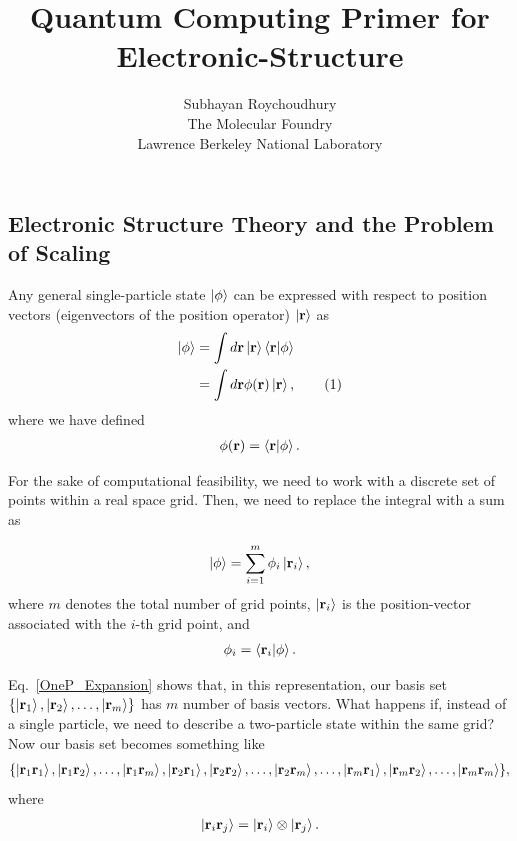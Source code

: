 \documentclass[12pt,oneside]{book}
\title{Quantum Computing Primer for Electronic-Structure}
\author{Subhayan Roychoudhury\\ The Molecular Foundry\\ Lawrence Berkeley National Laboratory}
\date{}
\newcommand\numberthis{\addtocounter{equation}{1}\tag{\theequation}}
\begin{document}
\maketitle

\subsection*{Electronic Structure Theory and the Problem of Scaling}

Any general single-particle state $\ket{\phi}$ can be expressed with respect to position vectors (eigenvectors of the position operator) $\ket{\mathbf{r}}$ as
\begin{align*}
    \ket{\phi} &{}= \int d \mathbf{r} \ket{\mathbf{r}}\braket{\mathbf{r}|\phi}\\
    &{} = \int d\mathbf{r} \phi(\mathbf{r})\ket{\mathbf{r}}, \numberthis
\end{align*}
where we have defined
\begin{align}
    \phi(\mathbf{r})= \braket{\mathbf{r}|\phi}.
\end{align}

For the sake of computational feasibility, we need to work with a discrete set of points within a real space grid. Then, we need to replace the integral with a sum as

\begin{align}\label{OneP_Expansion}
    \ket{\phi} = \sum_{i=1}^m \phi_i \ket{\mathbf{r}_i},
\end{align}
where $m$ denotes the total number of grid points, $\ket{\mathbf{r}_i}$ is the position-vector associated with the $i$-th grid point, and 
\begin{align}
    \phi_i=\braket{\mathbf{r}_i|\phi}.
\end{align}

Eq.~\ref{OneP_Expansion} shows that, in this representation, our basis set $\{\ket{\mathbf{r}_1}, \ket{\mathbf{r}_2},\hdots, \ket{\mathbf{r}_m}\}$ has $m$ number of basis vectors. What happens if, instead of a single particle, we need to describe a two-particle state within the same grid? Now our basis set becomes something like
\begin{align*}
    \{\ket{\mathbf{r}_1\mathbf{r}_1}, \ket{\mathbf{r}_1\mathbf{r}_2} , \hdots , \ket{\mathbf{r}_1\mathbf{r}_m}, \ket{\mathbf{r}_2\mathbf{r}_1} , \ket{\mathbf{r}_2\mathbf{r}_2}, \hdots , \ket{\mathbf{r}_2\mathbf{r}_m}, \hdots , \ket{\mathbf{r}_m\mathbf{r}_1}, \ket{\mathbf{r}_m\mathbf{r}_2}, \hdots , \ket{\mathbf{r}_m\mathbf{r}_m}\},
\end{align*}
where 
\begin{align*}
\ket{\mathbf{r}_i \mathbf{r}_j} = \ket{\mathbf{r}_i}\otimes\ket{\mathbf{r}_j}.
\end{align*}
\end{document}
